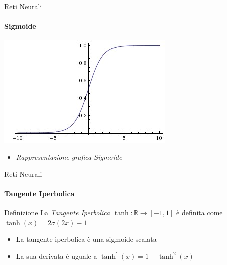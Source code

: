 \documentclass[
 ]{beamer}
\begin{document}
\begin{frame}{Reti Neurali}
    \framesubtitle{Sigmoide}
    
    \begin{center}
      \includegraphics[scale = 0.6]{sigmoid.jpeg}
    \end{center}
  
    \bigskip 
  
  \begin{itemize}
    \setlength\itemsep{1em}
    \item[] \large \emph{Rappresentazione grafica Sigmoide}
  \end{itemize}       
\end{frame} 



\begin{frame}{Reti Neurali}
    \framesubtitle{Tangente Iperbolica}
    \begin{block}{Definizione} 
        \large La \emph{Tangente Iperbolica} $\tanh: \mathbb{R} \rightarrow [-1, 1]$ è definita come $\tanh(x) = 2\sigma(2x) - 1$ 
    \end{block}\pause
    
    \bigskip
    
    \begin{itemize} [<+->]
        \setlength\itemsep{2em}
        \item \large La tangente iperbolica è una sigmoide scalata 
        \item \large La sua derivata è uguale a $\tanh^{\prime}(x) = 1 - \tanh^{2}(x)$
    \end{itemize}
\end{frame}
\end{document}
